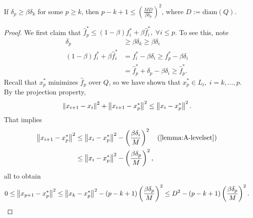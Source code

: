 \begin{lemma}
	\label{lemma:B-levelset}
	If $\delta_p \geq \beta \delta_k$ for some $p \geq k$, then $p - k + 1
	\leq \left( \frac{MD}{\beta \delta_p} \right)^2$, where $D :=
	\mathrm{diam}(Q)$.
\end{lemma}
\begin{proof}
	We first claim that $\hat{f}_p^* \leq (1 - \beta) {f}_i^* + \beta
	\hat{f}_i^*, \; \forall i \leq p$. To see this, note
	\begin{align*}
		\delta_p &\geq \beta \delta_k \geq \beta \delta_i \\
		(1 - \beta) f_i^* + \beta \hat{f}_i^* &= f_i^* - \beta \delta_i
		\geq f_p^* - \beta \delta_i \\
											  &= \hat{f}_p^* + \delta_p - \beta
											  \delta_i \geq \hat{f}_p^*.
	\end{align*}
	Recall that $x_p^*$ minimizes $\hat{f}_p$ over $Q$, so we have shown that
	$x_p^* \in L_i, \; i = k, \dots, p$. By the projection property,
	\[
		\left \| x_{i+1} - x_i \right \|^2 + \left \| x_{i+1} - x_p^* \right \|^2 \leq
		\left \| x_{i} - x_p^* \right \|^2.
	\]
	That implies
	\begin{align*}
		\norm{x_{i+1} - x_p^*}^2 &\leq \norm{x_i - x_p^*}^2
			- \left( \frac{\beta \delta_i}{M} \right)^2 \quad
			\text{(\cref{lemma:A-levelset})} \\
		&\leq \norm{x_i - x_p^*}^2 - \left( \frac{\beta \delta_p}{M}\right)^2,
	\end{align*}
	all to obtain
	\[
		0 \leq \left \| x_{p+1} - x_p^* \right \|^2 \leq \left \| x_k - x_p^* \right \|^2
		- (p - k + 1) \left( \frac{\beta \delta_p}{M} \right)^2 \leq
		D^2 - (p - k + 1) \left(\frac{\beta \delta_p}{M}\right)^2.
	\]
\end{proof}

